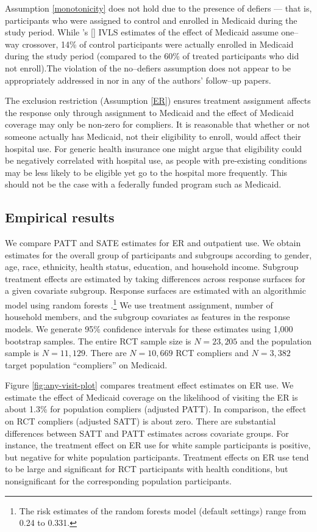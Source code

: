 \documentclass[12pt]{article}
\newcommand{\possessivecite}[1]{\citeauthor{#1}'s [\citeyear{#1}]}
\begin{document}
Assumption \ref{monotonicity} does not hold due to the presence of defiers --- that is, participants who were assigned to control and enrolled in Medicaid during the study period. While \possessivecite{finkelstein2012} IVLS estimates of the effect of Medicaid assume one--way crossover, 14\% of control participants were actually enrolled in Medicaid during the study period (compared to the 60\% of treated participants who did not enroll).The violation of the no--defiers assumption does not appear to be appropriately addressed in \citet{finkelstein2012} nor in any of the authors' follow--up papers. 

The exclusion restriction (Assumption \ref{ER}) ensures treatment assignment affects the response only through assignment to Medicaid  and the effect of Medicaid coverage may only be non-zero for compliers. It is reasonable that whether or not someone actually has Medicaid, not their eligibility to enroll, would affect their hospital use.  For generic health insurance one might argue that eligibility could be negatively correlated with hospital use, as people with pre-existing conditions may be less likely to be eligible yet go to the hospital more frequently.  This should not be the case with a federally funded program such as Medicaid. 
 
\subsection{Empirical results}

We compare PATT and SATE estimates for ER and outpatient use. We obtain estimates for the overall group of participants and subgroups according to gender, age, race, ethnicity, health status, education, and household income. Subgroup treatment effects are estimated by taking differences across response surfaces for a given covariate subgroup. Response surfaces are estimated with an algorithmic model using random forests \citep{breiman2001}.\footnote{The risk estimates of the random forests model (default settings) range from 0.24 to 0.331.} We use treatment assignment, number of household members, and the subgroup covariates as features in the response models. We generate 95\% confidence intervals for these estimates using 1,000 bootstrap samples. The entire RCT sample size is $N=23,205$ and the population sample is $N=11,129$. There are $N=10,669$ RCT compliers and $N=3,382$ target population ``compliers'' on Medicaid. 

Figure \ref{fig:any-visit-plot} compares treatment effect estimates on ER use. We estimate the effect of Medicaid coverage on the likelihood of visiting the ER is about 1.3\% for population compliers (adjusted PATT). In comparison, the effect on RCT compliers (adjusted SATT) is about zero. There are substantial differences between SATT and PATT estimates across covariate groups. For instance, the treatment effect on ER use for white sample participants is positive, but negative for white population participants. Treatment effects on ER use tend to be large and significant for RCT participants with health conditions, but nonsignificant for the corresponding population participants.
\end{document}
